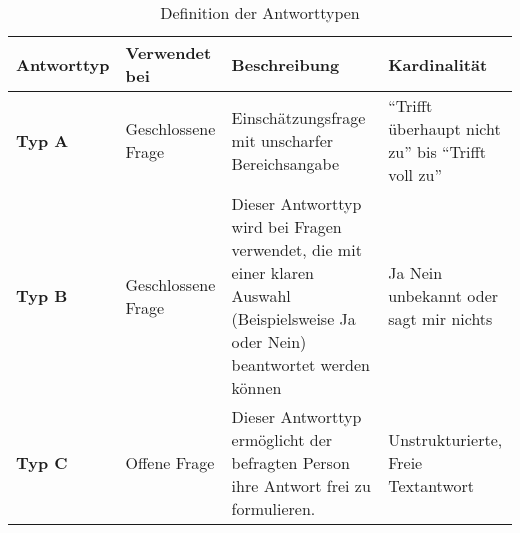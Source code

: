 \documentclass[../../main.tex]{subfiles}
\begin{document}

\sloppy 

\begin{table}[H]
\tablefontsize	
\centering
\caption{Definition der Antworttypen}
\label{Definition der Antworttypen}
\begin{tabular}{ |p{2cm}|p{2.5cm}|p{6cm}|p{4.5cm}|}

\hline
\tableheaderbgcolor
\textbf{Antworttyp} & \textbf{Verwendet bei} & \textbf{Beschreibung} & \textbf{Kardinalität}\\ 

\hline
\textbf{Typ A} & Geschlossene Frage &  Einschätzungsfrage mit unscharfer \newline Bereichsangabe & "`Trifft überhaupt nicht zu"' \newline bis \newline "`Trifft voll zu"' \\

\hline
\textbf{Typ B} & Geschlossene Frage & Dieser Antworttyp wird bei Fragen verwendet, die mit einer klaren Auswahl (Beispielsweise Ja oder Nein) beantwortet werden können & Ja \newline Nein \newline unbekannt oder sagt mir nichts \\

\hline
\textbf{Typ C} & Offene Frage &  Dieser Antworttyp ermöglicht der befragten Person ihre Antwort frei zu formulieren. & Unstrukturierte, Freie Textantwort \\
\hline

\end{tabular}
\end{table}



\end{document}
